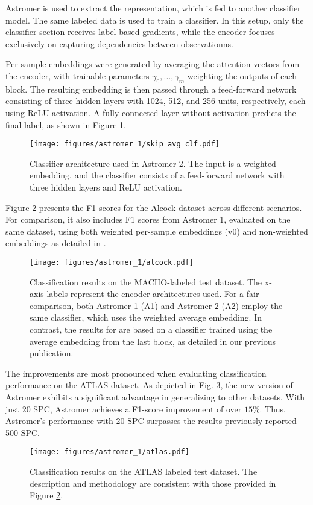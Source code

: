 Astromer is used to extract the representation, which is fed to another classifier model. The same labeled data is used to train a classifier. In this setup, only the classifier section receives label-based gradients, while the encoder focuses exclusively on capturing dependencies between observationns.

Per-sample embeddings were generated by averaging the attention vectors from the encoder, with trainable parameters $\gamma_0,...,\gamma_m$ weighting the outputs of each block. The resulting embedding is then passed through a feed-forward network consisting of three hidden layers with 1024, 512, and 256 units, respectively, each using ReLU activation. A fully connected layer without activation predicts the final label, as shown in Figure \ref{fig:clf-arch}.
\begin{figure}
    \centering
    \texttt{[image: figures/astromer\_1/skip\_avg\_clf.pdf]}
    \caption{Classifier architecture used in Astromer 2. The input is a weighted embedding, and the classifier consists of a feed-forward network with three hidden layers and ReLU activation.}
    \label{fig:clf-arch}
\end{figure}

Figure \ref{fig:macho-clf} presents the F1 scores for the Alcock dataset across different scenarios. For comparison, it also includes F1 scores from Astromer 1, evaluated on the same dataset, using both weighted per-sample embeddings (v0) and non-weighted embeddings as detailed in \citet{astromer}.
\begin{figure}
    \centering
    \texttt{[image: figures/astromer\_1/alcock.pdf]}
    \caption{Classification results on the MACHO-labeled test dataset. The x-axis labels represent the encoder architectures used. For a fair comparison, both Astromer 1 (A1) and Astromer 2 (A2) employ the same classifier, which uses the weighted average embedding. In contrast, the results for \cite{astromer} are based on a classifier trained using the average embedding from the last block, as detailed in our previous publication.}
    \label{fig:macho-clf}
\end{figure}

The improvements are most pronounced when evaluating classification performance on the ATLAS dataset. As depicted in Fig. \ref{fig:atlas-clf}, the new version of Astromer exhibits a significant advantage in generalizing to other datasets. With just 20 SPC, Astromer achieves a F1-score improvement of over $15\%$. Thus, Astromer's performance with 20 SPC surpasses the results previously reported 500 SPC.
\begin{figure}
    \centering
    \texttt{[image: figures/astromer\_1/atlas.pdf]}
    \caption{Classification results on the ATLAS labeled test dataset. The description and methodology are consistent with those provided in Figure \ref{fig:macho-clf}.}
    \label{fig:atlas-clf}
\end{figure}

